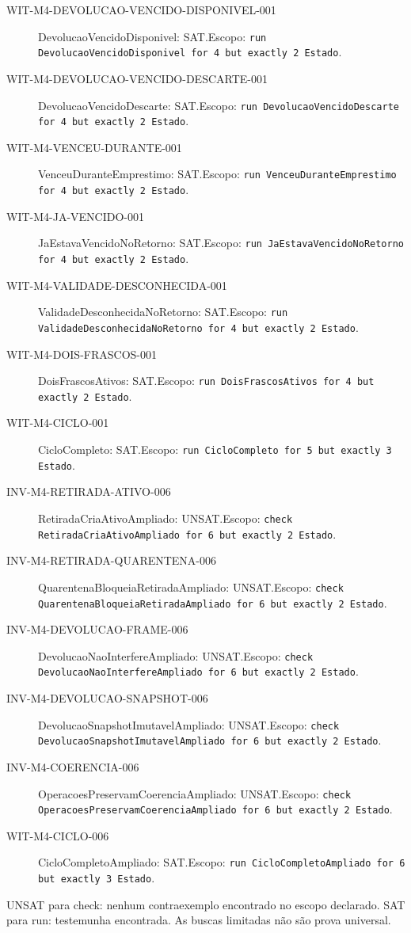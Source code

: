 \begin{description}
\item[WIT-M4-DEVOLUCAO-VENCIDO-DISPONIVEL-001] DevolucaoVencidoDisponivel: SAT.\newline Escopo: \texttt{run DevolucaoVencidoDisponivel for 4 but exactly 2 Estado}.
\item[WIT-M4-DEVOLUCAO-VENCIDO-DESCARTE-001] DevolucaoVencidoDescarte: SAT.\newline Escopo: \texttt{run DevolucaoVencidoDescarte for 4 but exactly 2 Estado}.
\item[WIT-M4-VENCEU-DURANTE-001] VenceuDuranteEmprestimo: SAT.\newline Escopo: \texttt{run VenceuDuranteEmprestimo for 4 but exactly 2 Estado}.
\item[WIT-M4-JA-VENCIDO-001] JaEstavaVencidoNoRetorno: SAT.\newline Escopo: \texttt{run JaEstavaVencidoNoRetorno for 4 but exactly 2 Estado}.
\item[WIT-M4-VALIDADE-DESCONHECIDA-001] ValidadeDesconhecidaNoRetorno: SAT.\newline Escopo: \texttt{run ValidadeDesconhecidaNoRetorno for 4 but exactly 2 Estado}.
\item[WIT-M4-DOIS-FRASCOS-001] DoisFrascosAtivos: SAT.\newline Escopo: \texttt{run DoisFrascosAtivos for 4 but exactly 2 Estado}.
\item[WIT-M4-CICLO-001] CicloCompleto: SAT.\newline Escopo: \texttt{run CicloCompleto for 5 but exactly 3 Estado}.
\item[INV-M4-RETIRADA-ATIVO-006] RetiradaCriaAtivoAmpliado: UNSAT.\newline Escopo: \texttt{check RetiradaCriaAtivoAmpliado for 6 but exactly 2 Estado}.
\item[INV-M4-RETIRADA-QUARENTENA-006] QuarentenaBloqueiaRetiradaAmpliado: UNSAT.\newline Escopo: \texttt{check QuarentenaBloqueiaRetiradaAmpliado for 6 but exactly 2 Estado}.
\item[INV-M4-DEVOLUCAO-FRAME-006] DevolucaoNaoInterfereAmpliado: UNSAT.\newline Escopo: \texttt{check DevolucaoNaoInterfereAmpliado for 6 but exactly 2 Estado}.
\item[INV-M4-DEVOLUCAO-SNAPSHOT-006] DevolucaoSnapshotImutavelAmpliado: UNSAT.\newline Escopo: \texttt{check DevolucaoSnapshotImutavelAmpliado for 6 but exactly 2 Estado}.
\item[INV-M4-COERENCIA-006] OperacoesPreservamCoerenciaAmpliado: UNSAT.\newline Escopo: \texttt{check OperacoesPreservamCoerenciaAmpliado for 6 but exactly 2 Estado}.
\item[WIT-M4-CICLO-006] CicloCompletoAmpliado: SAT.\newline Escopo: \texttt{run CicloCompletoAmpliado for 6 but exactly 3 Estado}.
\end{description}
UNSAT para check: nenhum contraexemplo encontrado no escopo declarado. SAT para run: testemunha encontrada. As buscas limitadas não são prova universal.

